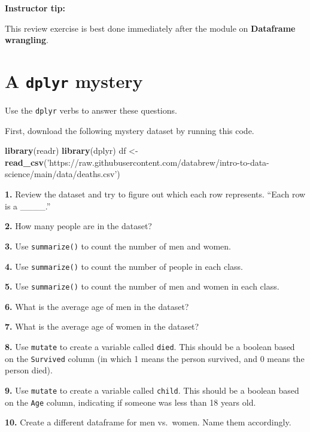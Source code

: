 \documentclass[
]{book}
\newenvironment{Shaded}{\begin{snugshade}}{\end{snugshade}}
\newcommand{\KeywordTok}[1]{\textcolor[rgb]{0.13,0.29,0.53}{\textbf{#1}}}
\newcommand{\NormalTok}[1]{#1}
\newcommand{\StringTok}[1]{\textcolor[rgb]{0.31,0.60,0.02}{#1}}
\begin{document}
\leavevmode\hypertarget{tip-text}{}%
\textbf{Instructor tip:}

This review exercise is best done immediately after the module on \textbf{Dataframe wrangling}.

\hypertarget{a-dplyr-mystery}{%
\chapter{\texorpdfstring{A \texttt{dplyr} mystery}{A dplyr mystery}}\label{a-dplyr-mystery}}

Use the \texttt{dplyr} verbs to answer these questions.

First, download the following mystery dataset by running this code.

\begin{Shaded}
\begin{Highlighting}[]
\KeywordTok{library}\NormalTok{(readr)}
\KeywordTok{library}\NormalTok{(dplyr)}
\NormalTok{df <-}\StringTok{ }\KeywordTok{read_csv}\NormalTok{(}\StringTok{'https://raw.githubusercontent.com/databrew/intro-to-data-science/main/data/deaths.csv'}\NormalTok{)}
\end{Highlighting}
\end{Shaded}

\textbf{1.} Review the dataset and try to figure out which each row represents. ``Each row is a \_\_\_\_.''

\textbf{2.} How many people are in the dataset?

\textbf{3.} Use \texttt{summarize()} to count the number of men and women.

\textbf{4.} Use \texttt{summarize()} to count the number of people in each class.

\textbf{5.} Use \texttt{summarize()} to count the number of men and women in each class.

\textbf{6.} What is the average age of men in the dataset?

\textbf{7.} What is the average age of women in the dataset?

\textbf{8.} Use \texttt{mutate} to create a variable called \texttt{died}. This should be a boolean based on the \texttt{Survived} column (in which 1 means the person survived, and 0 means the person died).

\textbf{9.} Use \texttt{mutate} to create a variable called \texttt{child}. This should be a boolean based on the \texttt{Age} column, indicating if someone was less than 18 years old.

\textbf{10.} Create a different dataframe for men vs.~women. Name them accordingly.
\end{document}

